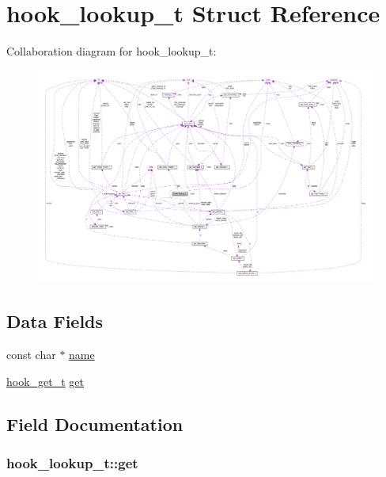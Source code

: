 \hypertarget{structhook__lookup__t}{}\section{hook\+\_\+lookup\+\_\+t Struct Reference}
\label{structhook__lookup__t}


Collaboration diagram for hook\+\_\+lookup\+\_\+t\+:
\nopagebreak
\begin{figure}[H]
\begin{center}
\leavevmode
\includegraphics[width=350pt]{structhook__lookup__t__coll__graph}
\end{center}
\end{figure}
\subsection*{Data Fields}
\begin{DoxyCompactItemize}
\item 
const char $\ast$ \hyperlink{structhook__lookup__t_aa4ff74aeb92740bdc7479838f06143d9}{name}
\item 
\hyperlink{mod__info_8c_a10df5370dfde4b0ad0d8997a68650d4f}{hook\+\_\+get\+\_\+t} \hyperlink{structhook__lookup__t_a36870306ab419072c7a8f67cfbc15d44}{get}
\end{DoxyCompactItemize}


\subsection{Field Documentation}
\subsubsection[{\texorpdfstring{get}{get}}]{ hook\+\_\+lookup\+\_\+t\+::get}\hypertarget{structhook__lookup__t_a36870306ab419072c7a8f67cfbc15d44}{}\label{structhook__lookup__t_a36870306ab419072c7a8f67cfbc15d44}
